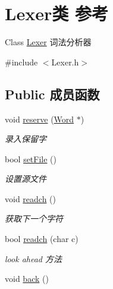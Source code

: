 \hypertarget{class_lexer}{}\section{Lexer类 参考}
\label{class_lexer}


Class \hyperlink{class_lexer}{Lexer} 词法分析器  




{\ttfamily \#include $<$Lexer.\+h$>$}

\subsection*{Public 成员函数}
\begin{DoxyCompactItemize}
\item 
\mbox{\label{class_lexer_ae96c693bf6eba38f21adab5fc94c18b1}} 
void \hyperlink{class_lexer_ae96c693bf6eba38f21adab5fc94c18b1}{reserve} (\hyperlink{class_word}{Word} $\ast$)
\begin{DoxyCompactList}\small\item\em 录入保留字 \end{DoxyCompactList}\item 
\mbox{\label{class_lexer_a3fafe4fb32f4da95a08d1062996b0409}} 
bool \hyperlink{class_lexer_a3fafe4fb32f4da95a08d1062996b0409}{set\+File} ()
\begin{DoxyCompactList}\small\item\em 设置源文件 \end{DoxyCompactList}\item 
\mbox{\label{class_lexer_a5c91a26ad6b4294bf7bb8d4c46ea529b}} 
void \hyperlink{class_lexer_a5c91a26ad6b4294bf7bb8d4c46ea529b}{readch} ()
\begin{DoxyCompactList}\small\item\em 获取下一个字符 \end{DoxyCompactList}\item 
bool \hyperlink{class_lexer_acbe68a5d98ebc3b3a87fd27f000030a5}{readch} (char c)
\begin{DoxyCompactList}\small\item\em look ahead 方法 \end{DoxyCompactList}\item 
\mbox{\label{class_lexer_ae28380e5c67144a1aeaf37f33ab11fb2}} 
void \hyperlink{class_lexer_ae28380e5c67144a1aeaf37f33ab11fb2}{back} ()

\end{DoxyCompactItemize}
